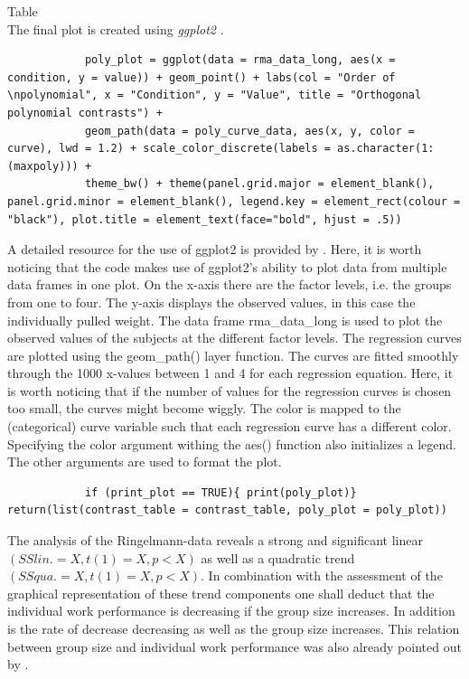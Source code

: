\documentclass[11pt]{article}
\begin{document}
		Table\\
		
		The final plot is created using \textit{ggplot2} \citep*{wickham2016ggplot2}.
		
		\begin{lstlisting}
			poly_plot = ggplot(data = rma_data_long, aes(x = condition, y = value)) + geom_point() + labs(col = "Order of \npolynomial", x = "Condition", y = "Value", title = "Orthogonal polynomial contrasts") + 
			geom_path(data = poly_curve_data, aes(x, y, color = curve), lwd = 1.2) + scale_color_discrete(labels = as.character(1:(maxpoly))) +
			theme_bw() + theme(panel.grid.major = element_blank(), panel.grid.minor = element_blank(), legend.key = element_rect(colour = "black"), plot.title = element_text(face="bold", hjust = .5))
		\end{lstlisting}
		
		A detailed resource for the use of ggplot2 is provided by \cite{wickham2016ggplot2}. Here, it is worth noticing that the code makes use of ggplot2's ability to plot data from multiple data frames in one plot. On the x-axis there are the factor levels, i.e. the groups from one to four. The y-axis displays the observed values, in this case the individually pulled weight. The data frame rma\_data\_long is used to plot the observed values of the subjects at the different factor levels. The regression curves are plotted using the geom\_path() layer function. The curves are fitted smoothly through the 1000 x-values between 1 and 4 for each regression equation. Here, it is worth noticing that if the number of values for the regression curves is chosen too small, the curves might become wiggly. The color is mapped to the (categorical) curve variable such that each regression curve has a different color. Specifying the color argument withing the aes() function also initializes a legend. The other arguments are used to format the plot.
		
		
		\begin{lstlisting}
			if (print_plot == TRUE){ print(poly_plot)} return(list(contrast_table = contrast_table, poly_plot = poly_plot))
		\end{lstlisting}	
		
		The analysis of the Ringelmann-data reveals a strong and significant linear $(𝑆𝑆𝑙𝑖𝑛.=𝑋, 𝑡(1)=𝑋, 𝑝 <𝑋)$ as well as a quadratic trend $(𝑆𝑆𝑞𝑢𝑎.=𝑋, 𝑡(1)=𝑋, 𝑝 <𝑋)$. In combination with the assessment of the graphical representation of these trend components one shall deduct that the individual work performance is decreasing if the group size increases. In addition is the rate of decrease decreasing as well as the group size increases. This relation between group size and individual work performance was also already pointed out by \cite{kravitz1986ringelmann}.
		
\end{document}
